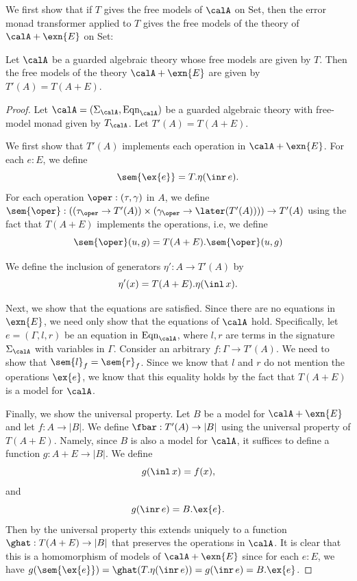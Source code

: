 We first show that if $T$ gives the free models of $\calA$ on Set, then the
error monad transformer applied to $T$ gives the free models of the theory of
$\calA + \exn{E}$ on Set:
%
\begin{lemma}\label{lem:error-monad-transformer-free-models}
    Let $\calA$ be a guarded algebraic theory whose free models are given by
    $T$. Then the free models of the theory $\calA + \exn{E}$ are given by
    $T'(A) = T(A + E)$.
\end{lemma}
\begin{proof}
    Let $\calA = (\Sigma_\calA, \text{Eqn}_\calA)$ be a guarded algebraic theory with
    free-model monad given by $T_\calA$. Let $T'(A) = T(A + E)$.

    We first show that $T'(A)$ implements each operation in $\calA +
    \exn{E}$. For each $e : E$, we define 
    \[ \sem{\ex{e}} = T.\eta(\inr\, e). \]
    For each operation $\oper : (\tau, \gamma)$ in $A$, we define $\sem{\oper} :
    ((\tau_\oper \to T'(A)) \times (\gamma_\oper \to \later (T'(A)))) \to T'(A)$
    using the fact that $T(A+E)$ implements the operations, i.e, we define
    \[ \sem{\oper}(u, g) = T(A+E).\sem{\oper}(u, g) \]
    
    We define the inclusion of generators $\eta' : A \to T'(A)$ by
    \[ \eta'(x) = T(A+E).\eta(\inl\, x). \]

    Next, we show that the equations are satisfied. Since there are no equations
    in $\exn{E}$, we need only show that the equations of $\calA$ hold.
    Specifically, let $e = (\Gamma, l, r)$ be an equation in $\text{Eqn}_\calA$, where
    $l, r$ are terms in the signature $\Sigma_\calA$ with variables in $\Gamma$.
    Consider an arbitrary $f : \Gamma \to T'(A)$. We need to show that
    $\sem{l}_f = \sem{r}_f$. Since we know that $l$ and $r$ do not mention the operations
    $\ex{e}$, we know that this equality holds by the fact that $T(A + E)$ is a
    model for $\calA$.

    Finally, we show the universal property. Let $B$ be a model for $\calA +
    \exn{E}$ and let $f : A \to |B|$. We define $\fbar : T'(A) \to |B|$ using
    the universal property of $T(A + E)$. Namely, since $B$ is also a model for
    $\calA$, it suffices to define a function $g : A + E \to |B|$. We define
    \[ g(\inl\, x) = f(x), \] 
    and
    \[ g(\inr\, e) = B.\ex{e}. \]
    Then by the universal property this extends uniquely to a function $\ghat :
    T(A + E) \to |B|$ that preserves the operations in $\calA$.
    It is clear that this is a homomorphism of models of $\calA +
    \exn{E}$ since for each $e : E$, we have $g(\sem{\ex{e}}) = \ghat(T.\eta(\inr\, e)) = g(\inr\, e) =
    B.\ex{e}$.


\end{proof}
